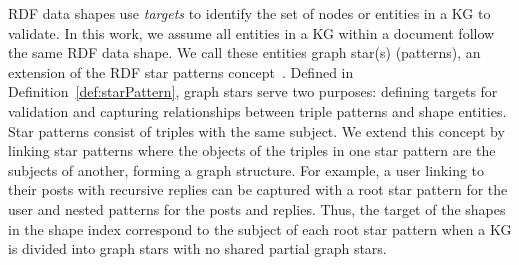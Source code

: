 RDF data shapes use \emph{targets} to identify the set of nodes or entities in a KG to validate.  
In this work, we assume all entities in a KG within a document follow the same RDF data shape.  
We call these entities graph star(s) (patterns), an extension of the RDF star patterns concept~\cite{Karim2020}.  
Defined in Definition~\ref{def:starPattern}, graph stars serve two purposes:
defining targets for validation and capturing relationships between triple patterns and shape entities.  
Star patterns consist of triples with the same subject.
We extend this concept by linking star patterns where the objects of the triples in one star pattern are the subjects of another, forming a graph structure.
For example, a user linking to their posts with recursive replies can be captured with a root star pattern for the user and nested patterns for the posts and replies.  
Thus, the target of the shapes in the shape index correspond to the subject of each root star pattern when a KG is divided into graph stars with no shared partial graph stars.  


